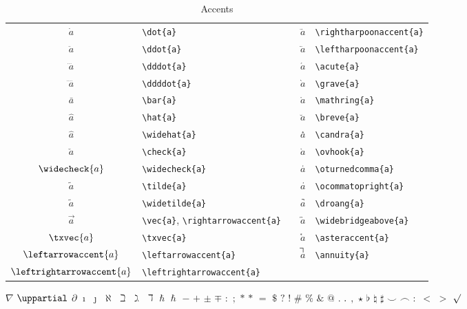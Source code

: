 \documentclass[captions=tableheading]{scrartcl}
\begin{document}
\begin{table}
  \caption{Accents}
  \label{tab:accents}
  \centering
  \begin{tabular}[c]{clp{1em}cl}
    \toprule
    $\dot{a}$ & \verb|\dot{a}| & &
    $\rightharpoonaccent{a}$ & \verb|\rightharpoonaccent{a}| \\
    $\ddot{a}$ & \verb|\ddot{a}| & &
    $\leftharpoonaccent{a}$ & \verb|\leftharpoonaccent{a}| \\
    $\dddot{a}$ & \verb|\dddot{a}| & &
    $\acute{a}$ & \verb|\acute{a}| \\
    $\ddddot{a}$ & \verb|\ddddot{a}| & &
    $\grave{a}$ & \verb|\grave{a}| \\
    $\bar{a}$ & \verb|\bar{a}| & &
    $\mathring{a}$ & \verb|\mathring{a}| \\
    \addlinespace
    $\hat{a}$ & \verb|\hat{a}| & &
    $\breve{a}$ & \verb|\breve{a}| \\
    $\widehat{a}$ & \verb|\widehat{a}| & &
    $\candra{a}$ & \verb|\candra{a}| \\
    $\check{a}$ & \verb|\check{a}| & &
    $\ovhook{a}$ & \verb|\ovhook{a}| \\
    $\widecheck{a}$ & \verb|\widecheck{a}| & &
    $\oturnedcomma{a}$ & \verb|\oturnedcomma{a}| \\
    $\tilde{a}$ & \verb|\tilde{a}| & &
    $\ocommatopright{a}$ & \verb|\ocommatopright{a}| \\
    $\widetilde{a}$ & \verb|\widetilde{a}| & &
    $\droang{a}$ & \verb|\droang{a}| \\
    \addlinespace
    $\vec{a}$ & \verb|\vec{a}|, \verb|\rightarrowaccent{a}| & &
    $\widebridgeabove{a}$ & \verb|\widebridgeabove{a}| \\
    $\txvec{a}$ & \verb|\txvec{a}| & &
    $\asteraccent{a}$ & \verb|\asteraccent{a}| \\
    $\leftarrowaccent{a}$ & \verb|\leftarrowaccent{a}| & &
    $\annuity{a}$ & \verb|\annuity{a}| \\
    $\leftrightarrowaccent{a}$ & \verb|\leftrightarrowaccent{a}| & &
    & \\
    \bottomrule
  \end{tabular}
\end{table}


$\nabla$
$\uppartial$
$\partial$
$\imath$
$\jmath$
$\aleph$
$\beth$
$\gimel$
$\daleth$
$\hbar$
$\hslash$
$-$
$+$
$\pm$
$\mp$
$:$
$;$
$*$
$\ast$
$=$
$\mathdollar$
$?$
$!$
$\#$
$\%$
$\&$
$@$
$.$
$\ldotp$
$,$
$\star$
$\flat$
$\natural$
$\sharp$
$\smile$
$\frown$
$\colon$
$<$
$>$
$\surd$
\end{document}
